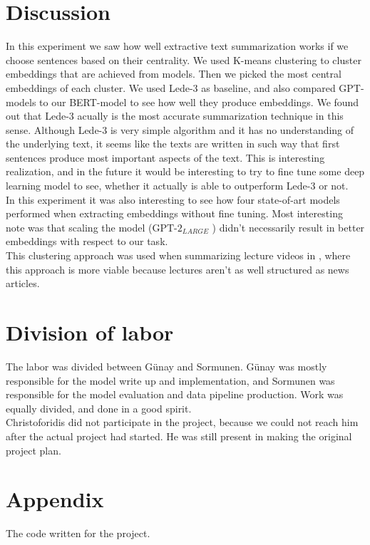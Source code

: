 \documentclass{article}
\newcommand{\gptlarge}{$\text{GPT-2}_{LARGE}$ }
\begin{document}
\clearpage
\section{Discussion}

\noindent
In this experiment we saw how well extractive text summarization works if we choose sentences based on their centrality. We used K-means clustering to cluster embeddings that are achieved from models. Then we picked the most central embeddings of each cluster. We used Lede-3 as baseline, and also compared GPT-models to our BERT-model to see how well they produce embeddings. We found out that Lede-3 acually is the most accurate summarization technique in this sense. Although Lede-3 is very simple algorithm and it has no understanding of the underlying text, it seems like the texts are written in such way that first sentences produce most important aspects of the text. This is interesting realization, and in the future it would be interesting to try to fine tune some deep learning model to see, whether it actually is able to outperform Lede-3 or not.\\

\noindent
In this experiment it was also interesting to see how four state-of-art models performed when extracting embeddings without fine tuning. Most interesting note was that scaling the model (\gptlarge) didn't necessarily result in better embeddings with respect to our task.\\

\noindent
This clustering approach was used when summarizing lecture videos in \cite{extractive_bert}, where this approach is more viable because lectures aren't as well structured as news articles. 

\clearpage
\section{Division of labor}

The labor was divided between Günay and Sormunen. Günay was mostly responsible for the model write up and implementation, and Sormunen was responsible for the model evaluation and data pipeline production. Work was equally divided, and done in a good spirit.\\

Christoforidis did not participate in the project, because we could not reach him after the actual project had started. He was still present in making the original project plan. 

\clearpage



\clearpage
\section{Appendix}
The code written for the project. 

\end{document}
